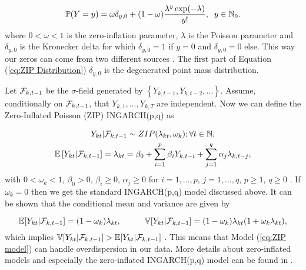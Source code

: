 \begin{equation}
\mathbb{P}(Y=y) = \omega \delta_{y,0}+ (1-\omega) \frac{\lambda^y \exp(-\lambda)}{y!}, \hspace{0.2cm} y \in \mathbb{N}_0.
\label{eq:ZIP Distribution}
\end{equation}
%
where $0 < \omega < 1$ is the zero-inflation parameter, $\lambda$ is the Poisson parameter and $\delta_{y,0}$ is the Kronecker delta for which $\delta_{y,0}=1$ if $y=0$ and $\delta_{y,0}=0$ else. This way our zeros can come from two different sources \textcite{Zhu:2012}. The first part of Equation (\ref{eq:ZIP Distribution}) $\delta_{y,0}$ is the degenerated point mass distribution.

Let $\mathcal{F}_{k,t-1}$ be the $\sigma$-field generated by $\left\{Y_{k,t-1},Y_{k,t-2},\ldots\right\}$. Assume, conditionally on $\mathcal{F}_{k,t-1}$, that $Y_{k,1},\ldots,Y_{k,T}$ are independent. Now we can define the Zero-Inflated Poisson (ZIP) INGARCH(p,q) as

\begin{equation}
\begin{gathered}
\label{eq:ZIP model}
Y_{kt} | \mathcal{F}_{k,t-1} \sim ZIP(\lambda_{kt},\omega_k); \forall t \in \mathbb{N}, \\
\mathbb{E}\left[Y_{kt} | \mathcal{F}_{k,t-1} \right] = \lambda_{kt} = \beta_0 + \sum_{i=1}^p\beta_i Y_{k,t-i} + \sum_{j=1}^q\alpha_j \lambda_{k,t-j},
\end{gathered}
\end{equation}
%
with $0<\omega_k<1$, $\beta_0>0$, $\beta_i\geq 0$, $\alpha_j \geq 0$ for $i=1,\ldots,p$, $j=1,\ldots,q$, $p\geq 1$, $q\geq 0$ \textcite{Zhu:2012}. If $\omega_k =0$ then we get the standard INGARCH(p,q) model discussed above. It can be shown that the conditional mean and variance are given by

\begin{equation}
\mathbb{E}[Y_{kt} | \mathcal{F}_{k,t-1}] = (1-\omega_k)\lambda_{kt}, \hspace{1cm} \mathbb{V}[Y_{kt} | \mathcal{F}_{k,t-1}] =(1-\omega_k)\lambda_{kt}(1+\omega_k \lambda_{kt}),
\label{eq:Conditional Mean and Variance ZIP}
\end{equation}
%
which implies $ \mathbb{V}[Y_{kt} | \mathcal{F}_{k,t-1}] > \mathbb{E}[Y_{kt} | \mathcal{F}_{k,t-1}]$ \textcite{Zhu:2012}. This means that Model (\ref{eq:ZIP model}) can handle overdispersion in our data. More details about zero-inflated models and especially the zero-inflated INGARCH(p,q) model can be found in \textcite{Zhu:2012}.

